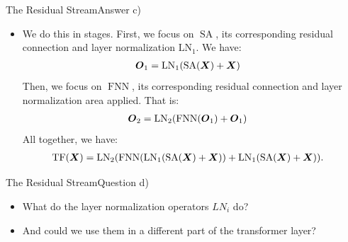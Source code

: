 \documentclass[t]{beamer}
\newcommand\op[1]{\operatorname{#1}}
\begin{document}
\begin{frame}{The Residual Stream}{Answer c)}
    \begin{itemize}
        \item We do this in stages. First, we focus on $\op{SA}$, its
              corresponding residual connection and layer normalization
              $\op{LN_1}$.
              We have:
              \begin{align}
                  \op{\mO_1} & = \op{LN_1}(\op{SA}(\mX) + \mX)
              \end{align}
              Then, we focus on $\op{FNN}$, its corresponding residual
              connection and layer normalization area applied.
              That is:
              \begin{align}
                  \op{\mO_2} & = \op{LN_2}(\op{FNN}(\mO_1) + \mO_1)
              \end{align}
              All together, we have:
              \begin{align}
                  \op{TF}(\mX) & = \op{LN_2}(\op{FNN}(\op{LN_1}(\op{SA}(\mX) + \mX)) + \op{LN_1}(\op{SA}(\mX) + \mX)).
              \end{align}
    \end{itemize}
\end{frame}

\begin{frame}{The Residual Stream}{Question d)}
    \begin{itemize}
        \item What do the layer normalization operators $LN_i$ do?
        \item And could we use them in a different part of the transformer
              layer?
    \end{itemize}
\end{frame}
\end{document}
